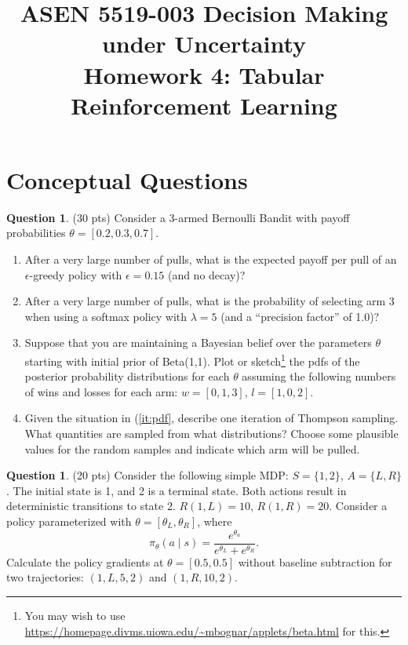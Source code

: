 \documentclass{article}
\title{ASEN 5519-003 Decision Making under Uncertainty\\
       Homework 4: Tabular Reinforcement Learning}
\theoremstyle{definition}
\newtheorem{question}[thm]{Question}
\begin{document}
\maketitle

\section{Conceptual Questions}

\begin{question}
    (30 pts) Consider a 3-armed Bernoulli Bandit with payoff probabilities $\theta = [0.2, 0.3, 0.7]$.
    \begin{enumerate}[label=\alph*),noitemsep]
        \item After a very large number of pulls, what is the expected payoff per pull of an $\epsilon$-greedy policy with $\epsilon=0.15$ (and no decay)?
        \item After a very large number of pulls, what is the probability of selecting arm 3 when using a softmax policy with $\lambda=5$ (and a ``precision factor'' of 1.0)?
        \item Suppose that you are maintaining a Bayesian belief over the parameters $\theta$ starting with initial prior of Beta(1,1). Plot or sketch\footnote{You may wish to use \url{https://homepage.divms.uiowa.edu/~mbognar/applets/beta.html} for this.} the pdfs of the posterior probability distributions for each $\theta$ assuming the following numbers of wins and losses for each arm: $w = [0, 1, 3]$, $l = [1, 0, 2]$.\label{it:pdf}
        \item Given the situation in (\ref{it:pdf}, describe one iteration of Thompson sampling. What quantities are sampled from what distributions? Choose some plausible values for the random samples and indicate which arm will be pulled.
    \end{enumerate}
\end{question}

\begin{question}
    (20 pts) Consider the following simple MDP: $S = \{1,2\}$, $A = \{L,R\}$. The initial state is 1, and 2 is a terminal state. Both actions result in deterministic transitions to state 2. $R(1,L) = 10$, $R(1,R) = 20$. Consider a policy parameterized with $\theta = [\theta_L, \theta_R]$, where $$\pi_\theta (a \mid s) = \frac{e^{\theta_a}}{e^{\theta_L} + e^{\theta_R}} \text{.}$$ Calculate the policy gradients at $\theta = [0.5, 0.5]$ without baseline subtraction for two trajectories: $(1,L,5,2)$ and $(1,R,10,2)$.
\end{question}
\end{document}
